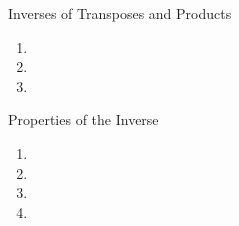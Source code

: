 %
\begin{theorem}{Inverses of Transposes and Products}\label{thm:inversetransposeprod}
\begin{enumerate}
\item
\item
\item
\end{enumerate}
\end{theorem}
%
%
\begin{theorem}{Properties of the Inverse}\label{thm:inverseproperties}
\begin{enumerate}
\item
\item
\item
\item
\end{enumerate}
\end{theorem}